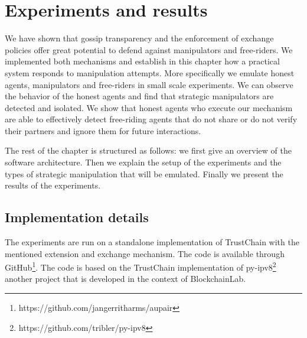 \chapter{Experiments and results}
We have shown that gossip transparency and the enforcement of exchange policies offer great potential
to defend against manipulators and free-riders. We implemented both mechanisms and establish in this chapter
how a practical system responds to manipulation attempts. More specifically we emulate honest agents,
manipulators and free-riders in small scale experiments. We can observe the behavior of the 
honest agents and find that strategic manipulators are detected and isolated. We show that honest agents who
execute our mechanism are able to effectively detect free-riding agents that do not share or do not verify their partners 
and ignore them for future interactions.

The rest of the chapter is structured as follows: we first give an overview of the software 
architecture. Then we explain the setup of the experiments and the types of strategic manipulation
that will be emulated. Finally we present the results of the experiments.


\section{Implementation details}
The experiments are run on a standalone implementation of TrustChain with the mentioned extension
and exchange mechanism. The code is available through GitHub\footnote{https://github.com/jangerritharms/aupair}.
The code is based on the TrustChain implementation of py-ipv8\footnote{https://github.com/tribler/py-ipv8}
another project that is developed in the context of BlockchainLab. 

